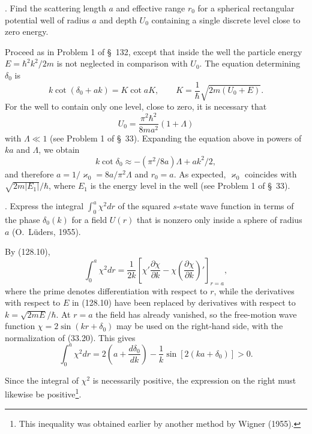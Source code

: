 . Find the scattering length $a$ and effective range $r_0$ for a spherical rectangular potential well of radius $a$ and depth $U_0$ containing a single discrete level close to zero energy.

\SolutionHeading Proceed as in Problem 1 of \S~132, except that inside the well the particle energy $E=\hbar^2k^2/2m$ is not neglected in comparison with $U_0$. The equation determining $\delta_0$ is
\[
 k\cot(\delta_0+ak)=K\cot aK,\qquad K=\frac1\hbar\sqrt{2m(U_0+E)}.
\]
For the well to contain only one level, close to zero, it is necessary that
\[
 U_0=\frac{\pi^2\hbar^2}{8ma^2}(1+\Lambda)
\]
with $\Lambda\ll1$ (see Problem 1 of \S~33). Expanding the equation above in powers of $ka$ and $\Lambda$, we obtain
\[
 k\cot\delta_0\approx-(\pi^2/8a)\Lambda+ak^2/2,
\]
and therefore $a=1/\varkappa_0=8a/\pi^2\Lambda$ and $r_0=a$. As expected, $\varkappa_0$ coincides with $\sqrt{2m|E_1|}/\hbar$, where $E_1$ is the energy level in the well (see Problem 1 of \S~33).

. Express the integral $\int_0^a\chi^2dr$ of the squared $s$-state wave function in terms of the phase $\delta_0(k)$ for a field $U(r)$ that is nonzero only inside a sphere of radius $a$ (O.~Lüders, 1955).

\SolutionHeading By (128.10),
\[
 \int_0^a\chi^2dr=\frac1{2k}\left[\chi'\frac{\partial\chi}{\partial k}
 -\chi\left(\frac{\partial\chi}{\partial k}\right)'\right]_{r=a},
\]
where the prime denotes differentiation with respect to $r$, while the derivatives with respect to $E$ in (128.10) have been replaced by derivatives with respect to $k=\sqrt{2mE}/\hbar$. At $r=a$ the field has already vanished, so the free-motion wave function $\chi=2\sin(kr+\delta_0)$ may be used on the right-hand side, with the normalization of (33.20). This gives
\[
 \int_0^a\chi^2dr=2\left(a+\frac{d\delta_0}{dk}\right)-\frac1k\sin[2(ka+\delta_0)]>0.
\]

Since the integral of $\chi^2$ is necessarily positive, the expression on the right must likewise be positive\footnote{This inequality was obtained earlier by another method by Wigner (1955).}.
